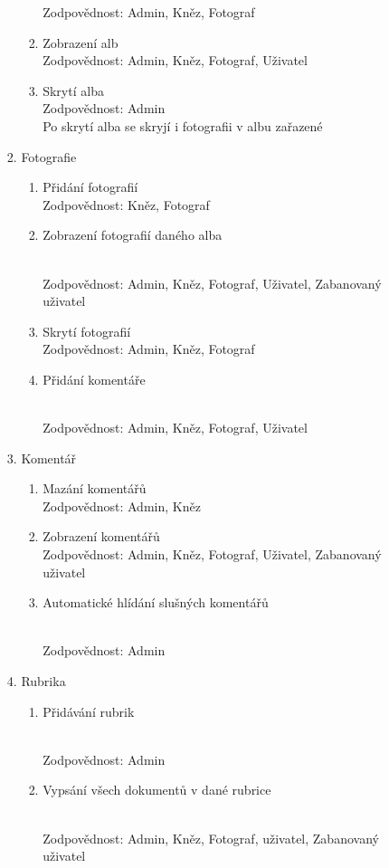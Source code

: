 \documentclass[12pt]{article}
\begin{document}
\begin{enumerate}
\begin{enumerate}[label*=\arabic*.]
\begin{enumerate}[label*=\arabic*.]
\begin{enumerate}[label*=\arabic*.]
					Zodpovědnost: Admin, Kněz, Fotograf
					\item Zobrazení alb\\
					Zodpovědnost: Admin, Kněz, Fotograf, Uživatel
					\item Skrytí alba\\
					Zodpovědnost: Admin\\
					Po skrytí alba se skryjí i fotografii v albu zařazené 
				\end{enumerate}
				\item Fotografie 
				\begin{enumerate}[label*=\arabic*.]
					\item Přidání fotografií\\
					Zodpovědnost: Kněz, Fotograf
					\item \hypertarget{fotky}{Zobrazení fotografií daného alba}\\
					Zodpovědnost: Admin, Kněz, Fotograf, Uživatel, Zabanovaný uživatel
					\item Skrytí fotografií\\
					Zodpovědnost: Admin, Kněz, Fotograf
					\item \hypertarget{5.1.5.4}{Přidání komentáře}\\
					Zodpovědnost: Admin, Kněz, Fotograf, Uživatel
				\end{enumerate}
				\item Komentář
				\begin{enumerate}[label*=\arabic*.]
					\item Mazání komentářů\\
					Zodpovědnost: Admin, Kněz
					\item Zobrazení komentářů \\
					Zodpovědnost: Admin, Kněz, Fotograf, Uživatel, Zabanovaný uživatel	
					\item \hypertarget{dog}{Automatické hlídání slušných komentářů}\\
					Zodpovědnost: Admin
				\end{enumerate}
				\item Rubrika 
				\begin{enumerate}[label*=\arabic*.]
					\item \hypertarget{5.1.7.1}{Přidávání rubrik} \\
					Zodpovědnost: Admin
					\item \hypertarget{5.1.7.2}{Vypsání všech dokumentů v dané rubrice}\\
					Zodpovědnost: Admin, Kněz, Fotograf, uživatel, Zabanovaný uživatel

\end{enumerate}
\end{enumerate}
\end{enumerate}
\end{enumerate}
\end{document}
